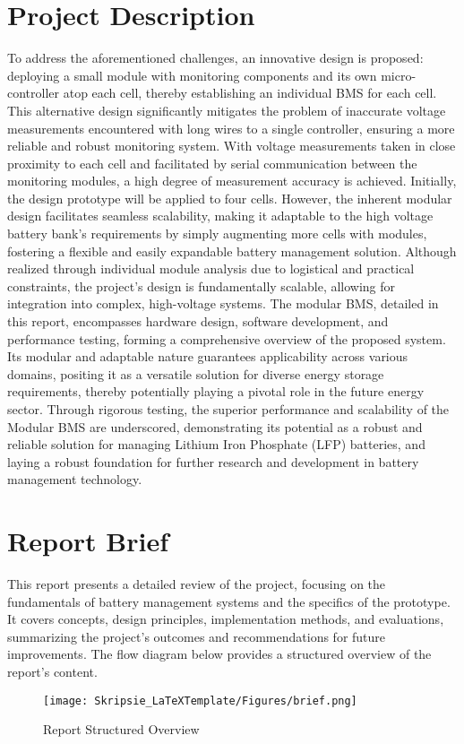 \section{Project Description}\label{sec:projDescrip} %
To address the aforementioned challenges, an innovative design is proposed: deploying a small module with monitoring components and its own micro-controller atop each cell, thereby establishing an individual BMS for each cell. This alternative design significantly mitigates the problem of inaccurate voltage measurements encountered with long wires to a single controller, ensuring a more reliable and robust monitoring system.\newline\newline
\noindent
With voltage measurements taken in close proximity to each cell and facilitated by serial communication between the monitoring modules, a high degree of measurement accuracy is achieved. Initially, the design prototype will be applied to four cells. However, the inherent modular design facilitates seamless scalability, making it adaptable to the high voltage battery bank’s requirements by simply augmenting more cells with modules, fostering a flexible and easily expandable battery management solution.\newpage
\noindent
Although realized through individual module analysis due to logistical and practical constraints, the project's design is fundamentally scalable, allowing for integration into complex, high-voltage systems. The modular BMS, detailed in this report, encompasses hardware design, software development, and performance testing, forming a comprehensive overview of the proposed system.\newline\newline
\noindent
Its modular and adaptable nature guarantees applicability across various domains, positing it as a versatile solution for diverse energy storage requirements, thereby potentially playing a pivotal role in the future energy sector. Through rigorous testing, the superior performance and scalability of the Modular BMS are underscored, demonstrating its potential as a robust and reliable solution for managing Lithium Iron Phosphate (LFP) batteries, and laying a robust foundation for further research and development in battery management technology.
\section{Report Brief}\label{sec:brief}
This report presents a detailed review of the project, focusing on the fundamentals of battery management systems and the specifics of the prototype. It covers concepts, design principles, implementation methods, and evaluations, summarizing the project's outcomes and recommendations for future improvements. The flow diagram below provides a structured overview of the report's content.\newline

\begin{figure}[h!]
\centering
\texttt{[image: Skripsie\_LaTeXTemplate/Figures/brief.png]}
\caption{Report Structured Overview \cite{Mermaid}}
\label{fig:brieff}
\end{figure}

\vfill
